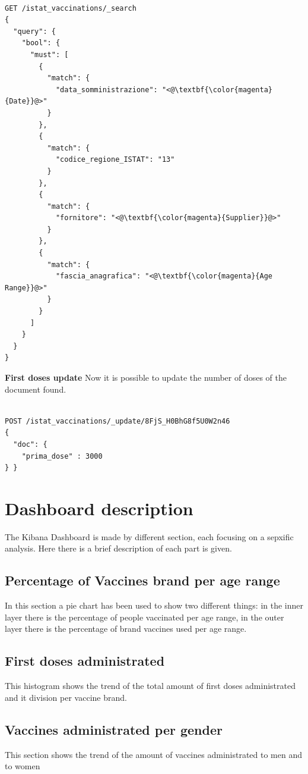 \documentclass{article}
\begin{document}
\begin{lstlisting}[language=cypher, label=lst:cypher-example]

GET /istat_vaccinations/_search
{
  "query": {
    "bool": {
      "must": [
        {
          "match": {
            "data_somministrazione": "<@\textbf{\color{magenta}{Date}}@>"
          }
        },
        {
          "match": {
            "codice_regione_ISTAT": "13"
          }
        },
        {
          "match": {
            "fornitore": "<@\textbf{\color{magenta}{Supplier}}@>"
          }
        },
        {
          "match": {
            "fascia_anagrafica": "<@\textbf{\color{magenta}{Age Range}}@>"
          }
        }
      ]
    }
  }
}
\end{lstlisting}
\hfill\break
\textbf{First doses update}
\hfill\break
Now it is possible to update the number of doses of the document found.

\begin{lstlisting}[language=cypher, label=lst:cypher-example]

POST /istat_vaccinations/_update/8FjS_H0BhG8f5U0W2n46
{
  "doc": {
    "prima_dose" : 3000
} }

\end{lstlisting}
\newpage

\section{Dashboard description}
The Kibana Dashboard is made by different section, each focusing on a sepxific analysis.
Here there is a brief description of each part is given.

\subsection{Percentage of Vaccines brand per age range}
In this section a pie chart has been used to show two different things: in the inner layer there is the percentage of people vaccinated per age range, in the outer layer there is the percentage of brand vaccines used per age range.

\subsection{First doses administrated}
This histogram shows the trend of the total amount of first doses administrated and it division per vaccine brand.

\subsection{Vaccines administrated per gender}
This section shows the trend of the amount of vaccines administrated to men and to women 
\end{document}
